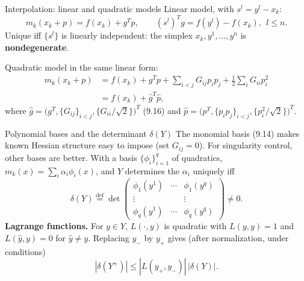 \documentclass[12pt,aspectratio=169]{beamer}
\begin{document}
\begin{frame}{Interpolation: linear and quadratic models}
  Linear model, with $s^l=y^l-x_k$:
  \begin{equation}
    m_k(x_k+p) = f(x_k)+g^Tp, \qquad (s^l)^Tg = f(y^l)-f(x_k),\ \ l\le n. \tag{9.11--9.13}
  \end{equation}
  Unique iff $\{s^l\}$ is linearly independent: the simplex $x_k,y^1,\dots,y^n$ is \textbf{nondegenerate}.

  Quadratic model in the same linear form:
  \begin{align}
    m_k(x_k+p) &= f(x_k)+g^Tp+\sum_{i<j}G_{ij}p_ip_j+\tfrac12\sum_iG_{ii}p_i^2 \tag{9.14}\\
    &= f(x_k)+\hat g^T\hat p, \tag{9.15}
  \end{align}
  where $\hat g = \bigl(g^T,\{G_{ij}\}_{i<j},\{G_{ii}/\sqrt2\}\bigr)^T$ (9.16) and
  $\hat p=\bigl(p^T,\{p_ip_j\}_{i<j},\{p_i^2/\sqrt2\}\bigr)^T$.
\end{frame}

\begin{frame}{Polynomial bases and the determinant $\delta(Y)$}
  The monomial basis (9.14) makes known Hessian structure easy to impose (set $G_{ij}=0$).
  For singularity control, other bases are better. With a basis $\{\phi_i\}_{i=1}^q$ of quadratics,
  $m_k(x)=\sum_i\alpha_i\phi_i(x)$, and $Y$ determines the $\alpha_i$ uniquely iff
  \begin{equation}
    \delta(Y) \overset{\text{def}}{=} \det\begin{pmatrix}
      \phi_1(y^1) & \cdots & \phi_1(y^q)\\
      \vdots & & \vdots\\
      \phi_q(y^1) & \cdots & \phi_q(y^q)
    \end{pmatrix} \neq 0. \tag{9.17}
  \end{equation}
  \textbf{Lagrange functions.} For $y\in Y$, $L(\cdot,y)$ is quadratic with $L(y,y)=1$ and $L(\hat y,y)=0$ for $\hat y\neq y$.
  Replacing $y_-$ by $y_+$ gives (after normalization, under conditions)
  \begin{equation}
    |\delta(Y^+)| \le |L(y_+,y_-)|\,|\delta(Y)|. \tag{9.18}
  \end{equation}
\end{frame}
\end{document}
